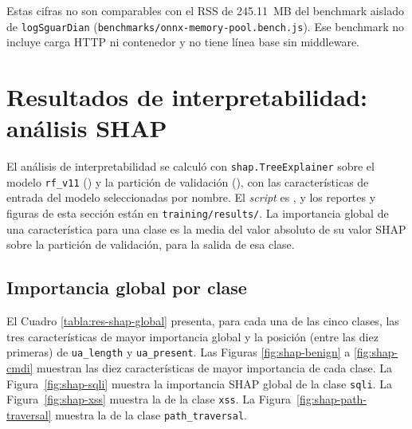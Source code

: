 {\sloppy Estas cifras no son comparables con el RSS de 245.11~MB del benchmark aislado de \texttt{logSguarDian} (\texttt{benchmarks/onnx-memory-pool.bench.js}). Ese benchmark no incluye carga HTTP ni contenedor y no tiene línea base sin middleware.\par}

\section{Resultados de interpretabilidad: análisis SHAP}

El análisis de interpretabilidad se calculó con \texttt{shap.TreeExplainer} sobre el modelo \texttt{rf\_v11} () y la partición de validación (), con las características de entrada del modelo seleccionadas por nombre. El \textit{script} es , y los reportes y figuras de esta sección están en \texttt{training/results/}. La importancia global de una característica para una clase es la media del valor absoluto de su valor SHAP sobre la partición de validación, para la salida de esa clase.

\subsection{Importancia global por clase}

El Cuadro \ref{tabla:res-shap-global} presenta, para cada una de las cinco clases, las tres características de mayor importancia global y la posición (entre las diez primeras) de \texttt{ua\_length} y \texttt{ua\_present}. Las Figuras \ref{fig:shap-benign} a \ref{fig:shap-cmdi} muestran las diez características de mayor importancia de cada clase. La Figura~\ref{fig:shap-sqli} muestra la importancia SHAP global de la clase \texttt{sqli}. La Figura~\ref{fig:shap-xss} muestra la de la clase \texttt{xss}. La Figura~\ref{fig:shap-path-traversal} muestra la de la clase \texttt{path\_traversal}.

